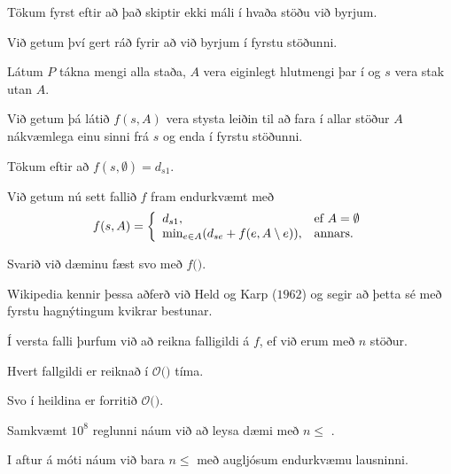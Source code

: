 {
	{
		\item<1-> Tökum fyrst eftir að það skiptir ekki máli í hvaða stöðu við byrjum.
		\item<2-> Við getum því gert ráð fyrir að við byrjum í fyrstu stöðunni.
		\item<3-> Látum $P$ tákna mengi alla staða, $A$ vera eiginlegt hlutmengi þar í og $s$ vera stak utan $A$.
		\item<4-> Við getum þá látið $f(s, A)$ vera stysta leiðin til að fara í allar stöður $A$ nákvæmlega einu sinni frá $s$ og enda í fyrstu stöðunni.
		\item<5-> Tökum eftir að $f(s, \emptyset) = d_{s1}$.
		\item<6-> Við getum nú sett fallið $f$ fram endurkvæmt með
		\[
			f(s, A) = 
			\left \{
			\env{array}
			{
				{l l}
				d_{s1}, & \text{ef $A = \emptyset$}\\
				\text{min}_{e \in A} (d_{se} + f(e, A \setminus e)), & \text{annars}.
			}
			\right .
		\]
		\item<7-> Svarið við dæminu fæst svo með $f($\onslide<8->{$1, P \setminus \{1\}$}$)$.
	}
}

{
	{
		\item<1-> Wikipedia kennir þessa aðferð við Held og Karp ($1962$) og segir að þetta sé með fyrstu hagnýtingum kvikrar bestunar.
		\item<2-> Í versta falli þurfum við að reikna  falligildi á $f$, ef við erum með $n$ stöður.
		\item<4-> Hvert fallgildi er reiknað í $\mathcal{O}($$)$ tíma.
		\item<6-> Svo í heildina er forritið $\mathcal{O}($\onslide<7->{$n^2 \cdot 2^n$}$)$.
		\item<8-> Samkvæmt $10^8$ reglunni náum við að leysa dæmi með $n \leq$ \onslide<9->{$18$}.
		\item<10-> I aftur á móti náum við bara $n \leq$  með augljósum endurkvæmu lausninni.
	}
}

{
}






























{
}



